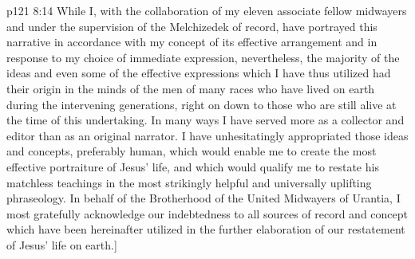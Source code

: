 \vs p121 8:14 While I, with the collaboration of my eleven associate fellow midwayers and under the supervision of the Melchizedek of record, have portrayed this narrative in accordance with my concept of its effective arrangement and in response to my choice of immediate expression, nevertheless, the majority of the ideas and even some of the effective expressions which I have thus utilized had their origin in the minds of the men of many races who have lived on earth during the intervening generations, right on down to those who are still alive at the time of this undertaking. In many ways I have served more as a collector and editor than as an original narrator. I have unhesitatingly appropriated those ideas and concepts, preferably human, which would enable me to create the most effective portraiture of Jesus’ life, and which would qualify me to restate his matchless teachings in the most strikingly helpful and universally uplifting phraseology. In behalf of the Brotherhood of the United Midwayers of Urantia, I most gratefully acknowledge our indebtedness to all sources of record and concept which have been hereinafter utilized in the further elaboration of our restatement of Jesus’ life on earth.]
